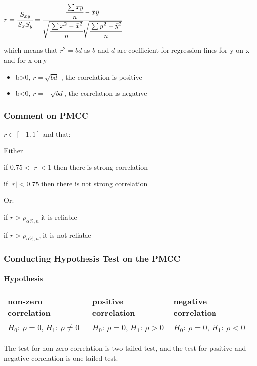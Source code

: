 \documentclass[]{article}
\let\oldparagraph\paragraph
\renewcommand{\paragraph}[1]{\oldparagraph{#1}\mbox{}}
\begin{document}
\(r = \cfrac{S_{xy}}{S_x S_y} = \cfrac{\cfrac{\sum xy}{n} - \bar{x}\bar{y}}{\sqrt{\cfrac{\sum{x^2}-\bar{x}^2}{n}}\sqrt{\cfrac{\sum{y^2}-\bar{y}^2}{n}}}\)

which means that \(r^2 = bd\) as \(b\) and \(d\) are coefficient for
regression lines for y on x and for x on y

\begin{itemize}
\item
  b\textgreater{}0, \(r = \sqrt{bd}\) , the correlation is positive
\item
  b\textless{}0, \(r = -\sqrt{bd}\), the correlation is negative
\end{itemize}

\subsubsection{Comment on PMCC}\label{header-n357}

\(r \in [-1,1]\) and that:

Either

if \( 0.75 < |r| < 1\) then there is strong correlation

if \(|r| < 0.75\) then there is not strong correlation

Or:

if \(r > \rho_{\alpha\%, n}\) it is reliable

if \(r > \rho_{\alpha\%, n}\), it is not reliable

\subsubsection{Conducting Hypothesis Test on the
PMCC}\label{header-n365}

\paragraph{Hypothesis}\label{header-n366}

\begin{longtable}[]{@{}lll@{}}
\toprule
non-zero correlation & positive correlation & negative
correlation\tabularnewline
\midrule
\endhead
\(H_0\): \(\rho = 0\), \(H_1\): \(\rho \ne 0\) & \(H_0\): \(\rho = 0\),
\(H_1\): \(\rho > 0\) & \(H_0\): \(\rho = 0\), \(H_1\):
\(\rho < 0\)\tabularnewline
\bottomrule
\end{longtable}

The test for non-zero correlation is two tailed test, and the test for
positive and negative correlation is one-tailed test.
\end{document}
